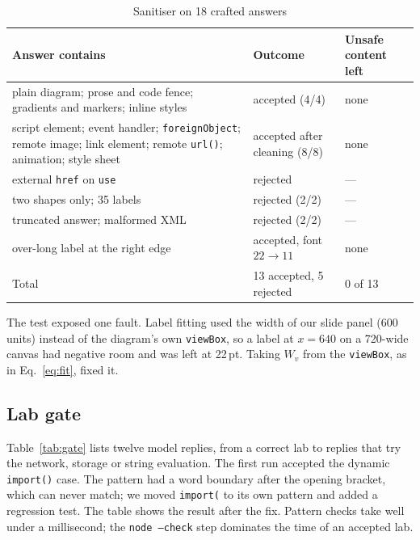 \documentclass[runningheads]{llncs}
\begin{document}
\begin{table}[H]
\centering
\caption{Sanitiser on 18 crafted answers}
\label{tab:svg}
\begin{tabular}{p{6.2cm}p{3.0cm}p{2.2cm}}
\toprule
Answer contains & Outcome & Unsafe content left \\
\midrule
plain diagram; prose and code fence; gradients and markers; inline styles & accepted (4/4) & none \\
script element; event handler; \texttt{foreignObject}; remote image; link element; remote \texttt{url()}; animation; style sheet & accepted after cleaning (8/8) & none \\
external \texttt{href} on \texttt{use} & rejected & --- \\
two shapes only; 35 labels & rejected (2/2) & --- \\
truncated answer; malformed XML & rejected (2/2) & --- \\
over-long label at the right edge & accepted, font $22 \to 11$ & none \\
\midrule
Total & 13 accepted, 5 rejected & 0 of 13 \\
\bottomrule
\end{tabular}
\end{table}

The test exposed one fault. Label fitting used the width of our slide panel (600 units) instead of the diagram's own
\texttt{viewBox}, so a label at $x = 640$ on a 720-wide canvas had negative room and was left at 22\,pt. Taking $W_v$ from the
\texttt{viewBox}, as in Eq.~\ref{eq:fit}, fixed it.

\subsection{Lab gate}
Table~\ref{tab:gate} lists twelve model replies, from a correct lab to replies that try the network, storage or string
evaluation. The first run accepted the dynamic \texttt{import()} case. The pattern had a word boundary after the opening
bracket, which can never match; we moved \texttt{import(} to its own pattern and added a regression test. The table shows the
result after the fix. Pattern checks take well under a millisecond; the \texttt{node --check} step dominates the time of an
accepted lab.
\end{document}
